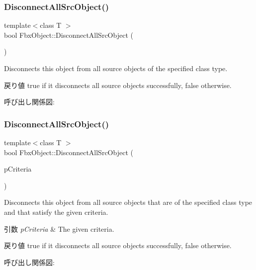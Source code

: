 \subsubsection{\texorpdfstring{Disconnect\+All\+Src\+Object()}{DisconnectAllSrcObject()}\hspace{0.1cm}{\footnotesize\ttfamily [3/4]}}
{\footnotesize\ttfamily template$<$class T $>$ \\
bool Fbx\+Object\+::\+Disconnect\+All\+Src\+Object (\begin{DoxyParamCaption}{ }\end{DoxyParamCaption})}

Disconnects this object from all source objects of the specified class type. \begin{DoxyReturn}{戻り値}
{\ttfamily true} if it disconnects all source objects successfully, {\ttfamily false} otherwise. 
\end{DoxyReturn}
呼び出し関係図\+:
\mbox{\label{class_fbx_object_ae5b578e810b22bcd8d0df323097ed995}} 
\subsubsection{\texorpdfstring{Disconnect\+All\+Src\+Object()}{DisconnectAllSrcObject()}\hspace{0.1cm}{\footnotesize\ttfamily [4/4]}}
{\footnotesize\ttfamily template$<$class T $>$ \\
bool Fbx\+Object\+::\+Disconnect\+All\+Src\+Object (\begin{DoxyParamCaption}\item[{const \hyperlink{class_fbx_criteria}{Fbx\+Criteria} \&}]{p\+Criteria }\end{DoxyParamCaption})}

Disconnects this object from all source objects that are of the specified class type and that satisfy the given criteria. 
\begin{DoxyParams}{引数}
{\em p\+Criteria} & The given criteria. \\
\hline
\end{DoxyParams}
\begin{DoxyReturn}{戻り値}
{\ttfamily true} if it disconnects all source objects successfully, {\ttfamily false} otherwise. 
\end{DoxyReturn}
呼び出し関係図\+:
\mbox{\label{class_fbx_object_a949fdf817b27505861f293cea4dc3b86}} 
